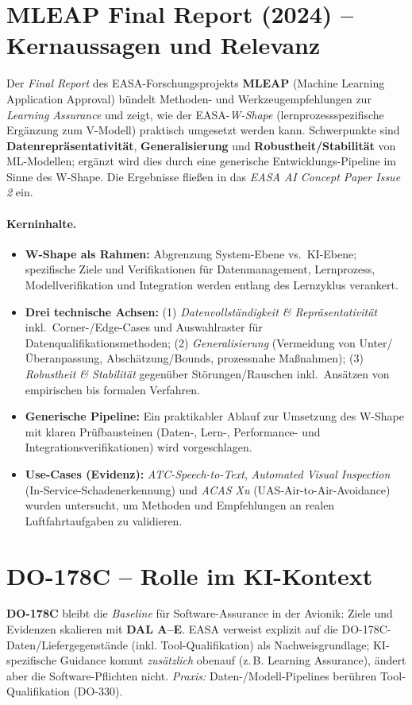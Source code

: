 \section{MLEAP Final Report (2024) – Kernaussagen und Relevanz}
Der \emph{Final Report} des EASA-Forschungsprojekts \textbf{MLEAP} (Machine Learning Application Approval) bündelt Methoden- und Werkzeugempfehlungen zur \emph{Learning Assurance} und zeigt, wie der EASA-\emph{W-Shape} (lernprozessspezifische Ergänzung zum V-Modell) praktisch umgesetzt werden kann. Schwerpunkte sind \textbf{Datenrepräsentativität}, \textbf{Generalisierung} und \textbf{Robustheit/Stabilität} von ML-Modellen; ergänzt wird dies durch eine generische Entwicklungs-Pipeline im Sinne des W-Shape. Die Ergebnisse fließen in das \emph{EASA AI Concept Paper Issue 2} ein.

\paragraph{Kerninhalte.}
\begin{itemize}
  \item \textbf{W-Shape als Rahmen:} Abgrenzung System-Ebene vs.\ KI-Ebene; spezifische Ziele und Verifikationen für Datenmanagement, Lernprozess, Modellverifikation und Integration werden entlang des Lernzyklus verankert. 
  \item \textbf{Drei technische Achsen:} (1) \emph{Datenvollständigkeit \& Repräsentativität} inkl.\ Corner-/Edge-Cases und Auswahlraster für Datenqualifikationsmethoden; (2) \emph{Generalisierung} (Vermeidung von Unter/Überanpassung, Abschätzung/Bounds, prozessnahe Maßnahmen); (3) \emph{Robustheit \& Stabilität} gegenüber Störungen/Rauschen inkl.\ Ansätzen von empirischen bis formalen Verfahren. 
  \item \textbf{Generische Pipeline:} Ein praktikabler Ablauf zur Umsetzung des W-Shape mit klaren Prüfbausteinen (Daten-, Lern-, Performance- und Integrationsverifikationen) wird vorgeschlagen. 
  \item \textbf{Use-Cases (Evidenz):} \emph{ATC-Speech-to-Text}, \emph{Automated Visual Inspection} (In-Service-Schadenerkennung) und \emph{ACAS Xu} (UAS-Air-to-Air-Avoidance) wurden untersucht, um Methoden und Empfehlungen an realen Luftfahrtaufgaben zu validieren. 
\end{itemize}





\section{DO-178C – Rolle im KI-Kontext}
\textbf{DO-178C} bleibt die \emph{Baseline} für Software-Assurance in der Avionik: Ziele und Evidenzen skalieren mit 
\textbf{DAL A–E}. EASA verweist explizit auf die DO-178C-Daten/Liefergegenstände (inkl. Tool-Qualifikation) als Nachweisgrundlage; 
KI-spezifische Guidance kommt \emph{zusätzlich} obenauf (z.\,B. Learning Assurance), ändert aber die Software-Pflichten nicht. 
\emph{Praxis:} Daten-/Modell-Pipelines berühren Tool-Qualifikation (DO-330).

